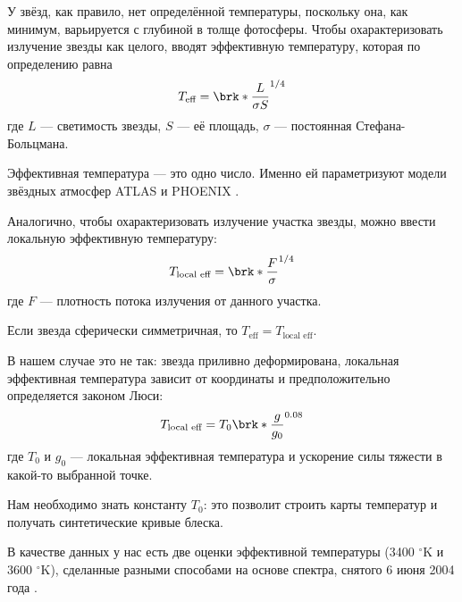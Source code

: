 

\label{sect:temperature}

У звёзд, как правило, нет определённой температуры, поскольку она, как минимум, варьируется с глубиной в толще фотосферы. Чтобы охарактеризовать излучение звезды как целого, вводят эффективную температуру, которая по определению равна
\begin{equation}
T_\text{eff} = \brk*{\frac{L}{\sigma S}}^{1/4}
\label{eq:Teff}
\end{equation}
где $L$ --- светимость звезды, $S$ --- её площадь, $\sigma$ --- постоянная Стефана-Больцмана.

Эффективная температура --- это одно число. Именно ей параметризуют модели звёздных атмосфер ATLAS \cite{AtlasSpectra, AtlasDarkening} и PHOENIX \cite{PHOENIX}.

Аналогично, чтобы охарактеризовать излучение участка звезды, можно ввести локальную эффективную температуру:
\begin{equation}
T_\text{local eff} = \brk*{\frac{F}{\sigma}}^{1/4}
\label{eq:Tlocaleff}
\end{equation}
где $F$ --- плотность потока излучения от данного участка.


Если звезда сферически симметричная, то $T_\text{eff} = T_\text{local eff}$.

В нашем случае это не так: звезда приливно деформирована, локальная эффективная температура зависит от координаты и предположительно определяется законом Люси:
\begin{equation}
T_\text{local eff} = T_0 \brk*{\frac{g}{g_0}}^{0.08}
\label{eq:Lucy}
\end{equation}
где $T_0$ и $g_0$ --- локальная эффективная температура и ускорение силы тяжести в какой-то выбранной точке.

Нам необходимо знать константу $T_0$: это позволит строить карты температур и получать синтетические кривые блеска.

В качестве данных у нас есть две оценки эффективной температуры (3400 ${}^\circ$K и 3600 ${}^\circ$K), сделанные разными способами на основе спектра, снятого 6 июня 2004 года \cite{TCRBtemperature}.

